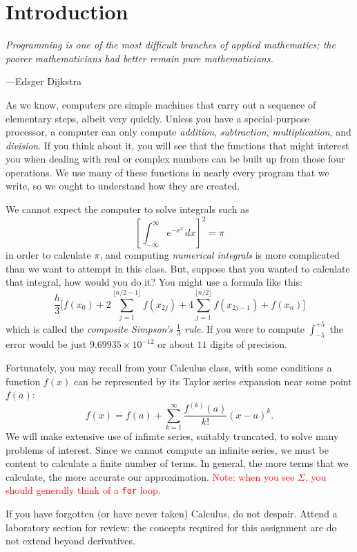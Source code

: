 \section{Introduction}

\textwidth \epigraph{\emph{Programming is one of the
most difficult branches of applied mathematics; the poorer
mathematicians had better remain pure mathematicians.}}{---Edsger
Dijkstra}

\noindent
As we know, computers are simple machines that carry out a sequence of
elementary steps, albeit very quickly. Unless you have a special-purpose
processor, a computer can only compute \emph{addition},
\emph{subtraction}, \emph{multiplication}, and \emph{division}. If you
think about it, you will see that the functions that might interest you
when dealing with real or complex numbers can be built up from those
four operations. We use many of these functions in nearly every program
that we write, so we ought to understand how they are created.

We cannot expect the computer to solve integrals such as
$$
\left [ \int_{-\infty}^\infty e^{-x^2} \, dx \right ] ^2
= \pi $$
in order to calculate $\pi$, and computing \emph{numerical
integrals} is more complicated than we want to attempt in this class.
But, suppose that
you wanted to calculate that integral, how would you do it? You might use a formula like this:
$$
\frac{h}{3}
   \bigg[f(x_0) + 2\sum_{j=1}^{\lfloor n/2-1 \rfloor} f(x_{2j}) + 4\sum_{j=1}^{\lfloor n/2 \rfloor} f(x_{2j-1}) + f(x_n)\bigg]
$$
which is called the \emph{composite Simpson's $\tfrac{1}{3}$ rule}.
If you were to compute $\int_{-5}^{+5}$ the error would be just $9.69935\times10^{-12}$ or about $11$ digits of precision.

Fortunately, you may recall from your Calculus class, with some
conditions a function $f(x)$ can be represented by its Taylor series
expansion near some point $f(a)$: $$ f(x) = f(a) + \sum_{k=1}^\infty
\frac{f^{(k)}(a)}{k!}{(x-a)}^k. $$ We will make extensive use of
infinite series, suitably truncated, to solve many problems of interest.
Since we cannot compute an infinite series, we must be content to
calculate a finite number of terms. In general, the more terms that we
calculate, the more accurate our approximation. \textcolor{red}{Note:
when you see $\Sigma$, you should generally think of a \texttt{for}
loop.}

If you have forgotten (or have never taken) Calculus, do not despair.
Attend a laboratory section for review: the concepts required for this
assignment are do not extend beyond derivatives.
